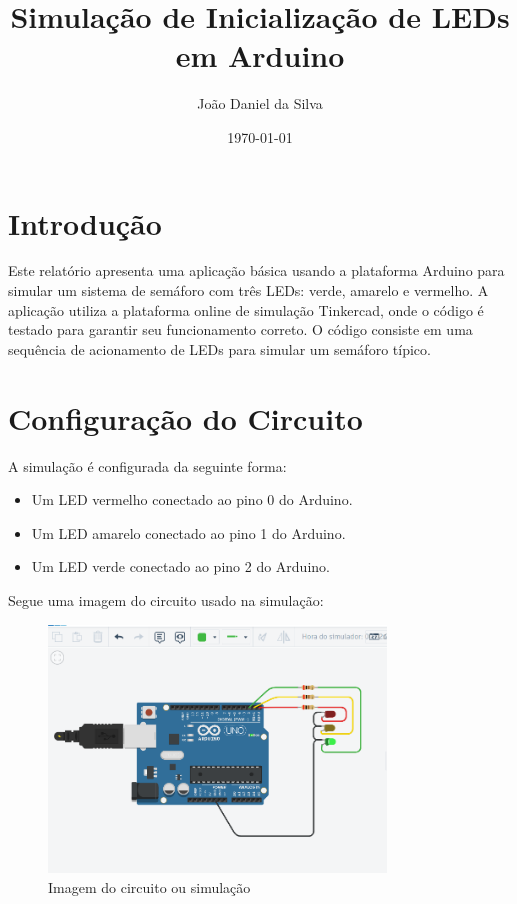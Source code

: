 \documentclass[a4paper,12pt]{article}
\title{Simulação de Inicialização de LEDs em Arduino}
\author{João Daniel da Silva}
\date{\today}
\begin{document}
\maketitle

\section{Introdução}
Este relatório apresenta uma aplicação básica usando a plataforma Arduino para simular um sistema de semáforo com três LEDs: verde, amarelo e vermelho. A aplicação utiliza a plataforma online de simulação Tinkercad, onde o código é testado para garantir seu funcionamento correto. O código consiste em uma sequência de acionamento de LEDs para simular um semáforo típico.

\section{Configuração do Circuito}
A simulação é configurada da seguinte forma:
\begin{itemize}
  \item Um LED vermelho conectado ao pino 0 do Arduino.
  \item Um LED amarelo conectado ao pino 1 do Arduino.
  \item Um LED verde conectado ao pino 2 do Arduino.
\end{itemize}

Segue uma imagem do circuito usado na simulação:

\begin{figure}[h]
  \centering
  \includegraphics[width=0.8\textwidth]{Captura de tela 2024-05-08 195051.png} %
  \caption{Imagem do circuito ou simulação}
\end{figure}
\end{document}

